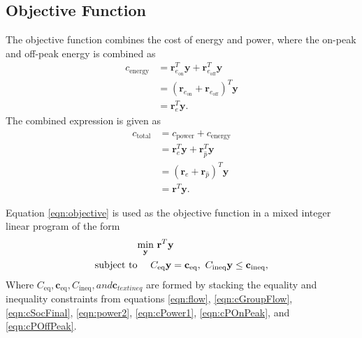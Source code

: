 \subsection{Objective Function}
The objective function combines the cost of energy and power, where the on-peak and off-peak energy is combined as 
\begin{equation}\label{eqn:cEnergy2}
	\begin{aligned}
		c_{\text{energy}} &= \mathbf{r}_{e_\text{on}}^T\mathbf{y} + \mathbf{r}_{e_\text{off}}^T\mathbf{y} \\
		&=\left ( \mathbf{r}_{e_\text{on}} + \mathbf{r}_{e_\text{off}} \right )^T \mathbf{y} \\
		&= \mathbf{r}_e^T\mathbf{y}.
	\end{aligned}
\end{equation}
The combined expression is given as 
\begin{equation}\label{eqn:objective}
	\begin{aligned}
		c_{\text{total}} &= c_{\text{power}} + c_{\text{energy}} \\ 
				 &= \mathbf{r}_e^T\mathbf{y} + \mathbf{r}_{\hat{p}}^T\mathbf{y} \\
				 &= \left ( \mathbf{r}_e + \mathbf{r}_{\hat{p}} \right )^T\mathbf{y} \\
				 &= \mathbf{r}^T\mathbf{y}.
	\end{aligned}
\end{equation}
\par Equation \ref{eqn:objective} is used as the objective function in a mixed integer linear program of the form
\begin{equation}
	\begin{aligned}
		& \underset{\mathbf{y}}{\scalebox{1}{\text{min}}} \ \mathbf{r}^T\mathbf{y} \\
		\text{subject to}& \ \ \ \  C_{\text{eq}}\mathbf{y} = \mathbf{c}_{\text{eq}}, \ C_{\text{ineq}}\mathbf{y} \le \mathbf{c}_{\text{ineq}},
	\end{aligned}
\end{equation}
Where $C_{\text{eq}}, \mathbf{c}_{\text{eq}}, C_{\text{ineq}}, and \mathbf{c}_{text{ineq}}$ are formed by stacking the equality and inequality constraints from equations \ref{eqn:flow}, \ref{eqn:cGroupFlow}, \ref{eqn:cSocFinal}, \ref{eqn:power2}, \ref{eqn:cPower1}, \ref{eqn:cPOnPeak}, and \ref{eqn:cPOffPeak}.
